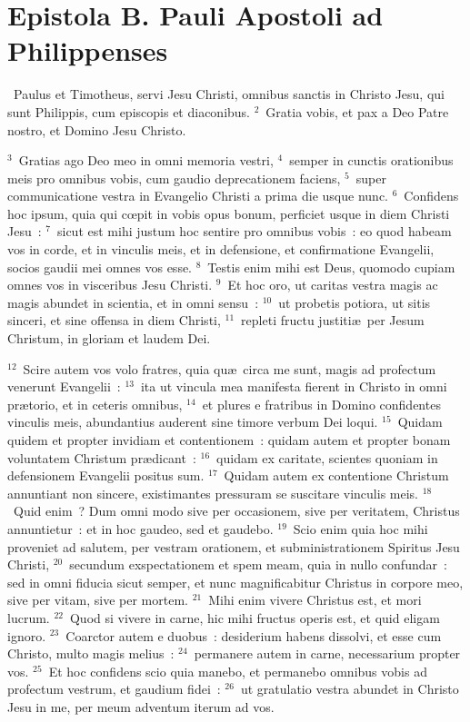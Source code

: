 \clearpage
{\centering \section*{Epistola B. Pauli Apostoli ad Philippenses}}\thispagestyle{empty}

~Paulus et Timotheus, servi Jesu Christi, omnibus sanctis in Christo Jesu, qui sunt Philippis, cum episcopis et diaconibus.
${}^{2}$~Gratia vobis, et pax a Deo Patre nostro, et Domino Jesu Christo.


${}^{3}$~Gratias ago Deo meo in omni memoria vestri,
${}^{4}$~semper in cunctis orationibus meis pro omnibus vobis, cum gaudio deprecationem faciens,
${}^{5}$~super communicatione vestra in Evangelio Christi a prima die usque nunc.
${}^{6}$~Confidens hoc ipsum, quia qui cœpit in vobis opus bonum, perficiet usque in diem Christi Jesu~:
${}^{7}$~sicut est mihi justum hoc sentire pro omnibus vobis~: eo quod habeam vos in corde, et in vinculis meis, et in defensione, et confirmatione Evangelii, socios gaudii mei omnes vos esse.
${}^{8}$~Testis enim mihi est Deus, quomodo cupiam omnes vos in visceribus Jesu Christi.
${}^{9}$~Et hoc oro, ut caritas vestra magis ac magis abundet in scientia, et in omni sensu~:
${}^{10}$~ut probetis potiora, ut sitis sinceri, et sine offensa in diem Christi,
${}^{11}$~repleti fructu justiti\ae\ per Jesum Christum, in gloriam et laudem Dei.


${}^{12}$~Scire autem vos volo fratres, quia qu\ae\ circa me sunt, magis ad profectum venerunt Evangelii~:
${}^{13}$~ita ut vincula mea manifesta fierent in Christo in omni pr\ae torio, et in ceteris omnibus,
${}^{14}$~et plures e fratribus in Domino confidentes vinculis meis, abundantius auderent sine timore verbum Dei loqui.
${}^{15}$~Quidam quidem et propter invidiam et contentionem~: quidam autem et propter bonam voluntatem Christum pr\ae dicant~:
${}^{16}$~quidam ex caritate, scientes quoniam in defensionem Evangelii positus sum.
${}^{17}$~Quidam autem ex contentione Christum annuntiant non sincere, existimantes pressuram se suscitare vinculis meis.
${}^{18}$~Quid enim~? Dum omni modo sive per occasionem, sive per veritatem, Christus annuntietur~: et in hoc gaudeo, sed et gaudebo.
${}^{19}$~Scio enim quia hoc mihi proveniet ad salutem, per vestram orationem, et subministrationem Spiritus Jesu Christi,
${}^{20}$~secundum exspectationem et spem meam, quia in nullo confundar~: sed in omni fiducia sicut semper, et nunc magnificabitur Christus in corpore meo, sive per vitam, sive per mortem.
${}^{21}$~Mihi enim vivere Christus est, et mori lucrum.
${}^{22}$~Quod si vivere in carne, hic mihi fructus operis est, et quid eligam ignoro.
${}^{23}$~Coarctor autem e duobus~: desiderium habens dissolvi, et esse cum Christo, multo magis melius~:
${}^{24}$~permanere autem in carne, necessarium propter vos.
${}^{25}$~Et hoc confidens scio quia manebo, et permanebo omnibus vobis ad profectum vestrum, et gaudium fidei~:
${}^{26}$~ut gratulatio vestra abundet in Christo Jesu in me, per meum adventum iterum ad vos.


